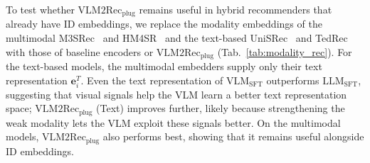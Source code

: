 To test whether $\text{VLM2Rec}_{\text{plug}}$ remains useful in hybrid recommenders that already have ID embeddings, we replace the modality embeddings of the multimodal M3SRec~\cite{modrec_m3srec} and HM4SR~\cite{modrec_hm4sr} and the text-based UniSRec~\cite{modrec_unisrec} and TedRec~\cite{modrec_tedrec} with those of baseline encoders or $\text{VLM2Rec}_{\text{plug}}$ (Tab.~\ref{tab:modality_rec}).
For the text-based models, the multimodal embedders supply only their text representation $\mathbf{e}_i^T$.
Even the text representation of $\text{VLM}_{\text{SFT}}$ outperforms $\text{LLM}_{\text{SFT}}$, suggesting that visual signals help the VLM learn a better text representation space; $\text{VLM2Rec}_{\text{plug}}$ (Text) improves further, likely because strengthening the weak modality lets the VLM exploit these signals better.
On the multimodal models, $\text{VLM2Rec}_{\text{plug}}$ also performs best, showing that it remains useful alongside ID embeddings.

\begin{table}[!t]
    \centering
    \caption{User-level $\Delta_{u,\mathrm{gap}}$ reduction and its correlation with rank recovery.}
    \label{tab:user_stratification}
    \setlength{\tabcolsep}{3pt}
\end{table}

